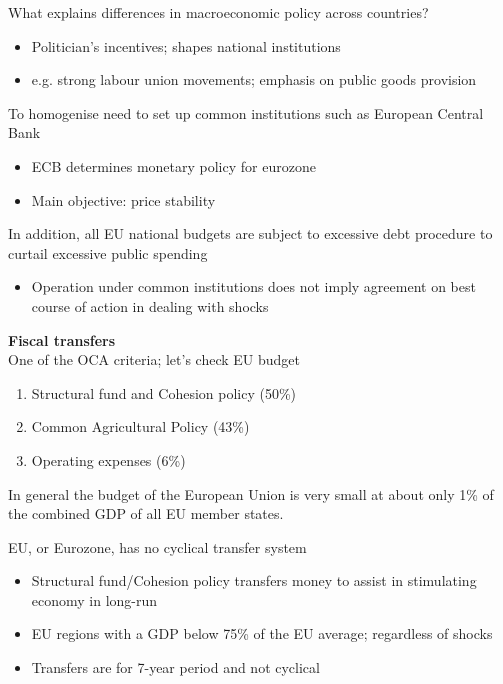 \documentclass{beamer}
\begin{document}
\begin{frame}
  What explains differences in macroeconomic policy across countries?
  \begin{itemize}
    \item Politician's incentives; shapes national institutions
    \item e.g. strong labour union movements; emphasis on public goods provision
  \end{itemize}
  \medskip
  To homogenise need to set up common institutions such as European Central Bank
  \begin{itemize}
    \item ECB determines monetary policy for eurozone
    \item Main objective: price stability
  \end{itemize}
\end{frame}

\begin{frame}
   In addition, all EU national budgets are subject to excessive debt procedure to curtail excessive public spending
  \begin{itemize}
    \item Operation under common institutions does not imply agreement on best course of action in dealing with shocks
  \end{itemize}
\end{frame}


\begin{frame}
  \textbf{Fiscal transfers}\\
   One of the OCA criteria; let's check EU budget  
  \begin{enumerate}
    \item Structural fund and Cohesion policy (50\%)
    \item Common Agricultural Policy (43\%)
    \item Operating expenses (6\%)
  \end{enumerate}
  \medskip
  In general the budget of the European Union is very small at about only 1\% of the combined GDP of all EU member states. 
\end{frame}

\begin{frame}
  EU, or Eurozone, has no cyclical transfer system
  \begin{itemize}
    \item Structural fund/Cohesion policy transfers money to assist in stimulating economy in long-run
    \item EU regions with a GDP below 75\% of the EU average; regardless of shocks
    \item Transfers are for 7-year period and not cyclical
  \end{itemize}
\end{frame}
\end{document}
